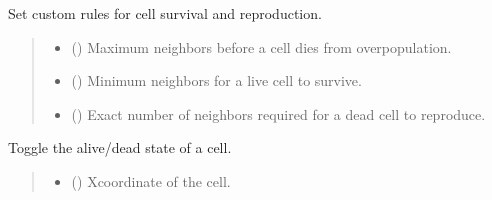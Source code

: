 \documentclass[letterpaper,10pt,oneside,english]{sphinxhowto}
\begin{document}
\begin{fulllineitems}
\begin{fulllineitems}
\label{\detokenize{core:core.game_of_life.GameOfLife.set_custom_rules}}
\pysigstartsignatures
\pysiglinewithargsret
{}
{\sphinxparamcomma {}\sphinxparamcomma {}}
{}
\pysigstopsignatures
\sphinxAtStartPar
Set custom rules for cell survival and reproduction.
\begin{quote}\begin{description}
\begin{itemize}
\item {} 
\sphinxAtStartPar
{} () \textendash{} Maximum neighbors before a cell dies from overpopulation.

\item {} 
\sphinxAtStartPar
{} () \textendash{} Minimum neighbors for a live cell to survive.

\item {} 
\sphinxAtStartPar
{} () \textendash{} Exact number of neighbors required for a dead cell to reproduce.

\end{itemize}

\end{description}\end{quote}

\end{fulllineitems}


\begin{fulllineitems}
\label{\detokenize{core:core.game_of_life.GameOfLife.toggle_cell}}
\pysigstartsignatures
\pysiglinewithargsret
{}
{\sphinxparamcomma {}}
{}
\pysigstopsignatures
\sphinxAtStartPar
Toggle the alive/dead state of a cell.
\begin{quote}\begin{description}
\begin{itemize}
\item {} 
\sphinxAtStartPar
{} () \textendash{} X\sphinxhyphen{}coordinate of the cell.


\end{itemize}
\end{description}
\end{quote}
\end{fulllineitems}
\end{fulllineitems}
\end{document}
